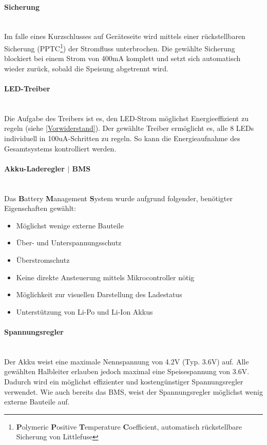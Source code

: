 \documentclass[12pt]{article}
\begin{document}
	\paragraph{Sicherung}\mbox{}\\
	Im falle eines Kurzschlusses auf Geräteseite wird mittels einer rückstellbaren Sicherung (PPTC\footnote{\textbf{P}olymeric \textbf{P}ositive \textbf{T}emperature \textbf{C}oefficient, automatisch rückstellbare Sicherung von Littlefuse}) der Stromfluss unterbrochen. Die gewählte Sicherung blockiert bei einem Strom von 400mA komplett und setzt sich automatisch wieder zurück, sobald die Speisung abgetrennt wird.
	\paragraph{LED-Treiber} \mbox{}\\
	Die Aufgabe des Treibers ist es, den LED-Strom möglichst Energieeffizient zu regeln (siehe \ref{Vorwiderstand}). Der gewählte Treiber ermöglicht es, alle 8 LEDs individuell in 100uA-Schritten zu regeln. So kann die Energieaufnahme des Gesamtsystems kontrolliert werden.
	\paragraph{Akku-Laderegler $\vert$ BMS} \mbox{}\\
	Das \textbf{B}attery \textbf{M}anagement \textbf{S}ystem wurde aufgrund folgender, benötigter Eigenschaften gewählt:
	\begin{itemize}
		\item Möglichst wenige externe Bauteile
		\item Über- und Unterspannungsschutz
		\item Überstromschutz
		\item Keine direkte Ansteuerung mittels Mikrocontroller nötig
		\item Möglichkeit zur visuellen Darstellung des Ladestatus
		\item Unterstützung von Li-Po und Li-Ion Akkus
	\end{itemize}
	\paragraph{Spannungsregler} \mbox{}\\
	Der Akku weist eine maximale Nennspannung von 4.2V (Typ. 3.6V) auf. Alle gewählten Halbleiter erlauben jedoch maximal eine Speisespannung von 3.6V. Dadurch wird ein möglichst effizienter und kostengünstiger Spannungs\-regler verwendet. Wie auch bereits das BMS, weist der Spannungsregler möglichst wenig externe Bauteile auf.
\end{document}
